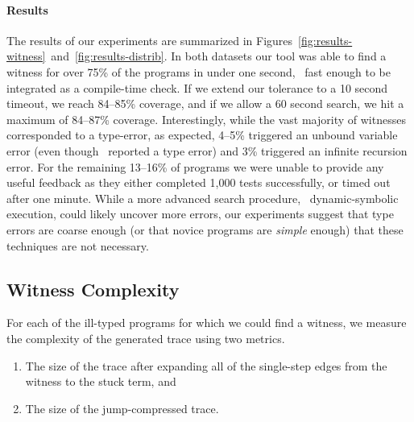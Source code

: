 \paragraph{Results}
\label{sec:nanomaly:results-witness}
The results of our experiments are summarized in
Figures~\ref{fig:results-witness}~and~\ref{fig:results-distrib}.
%
In both datasets our tool was able to find a witness for over 75\% of the
programs in under one second, \ie\ fast enough to be integrated as a
compile-time check. If we extend our tolerance to a 10 second timeout,
we reach 84--85\% coverage, and if we allow a 60 second search,
we hit a maximum of 84--87\% coverage.
%
Interestingly, while the vast majority of witnesses corresponded to a
type-error, as expected, 4--5\% triggered an unbound variable error (even
though \ocaml\ reported a type error) and 3\% triggered an infinite
recursion error.
%
For the remaining 13--16\% of programs we were unable to provide any useful
feedback as they either completed 1,000 tests successfully, or timed out
after one minute.
%
%
While a more advanced search procedure, \eg\ dynamic-symbolic execution,
could likely uncover more errors, our experiments suggest that
type errors are coarse enough (or that novice programs are \emph{simple}
enough) that these techniques are not necessary.




\subsection{Witness Complexity}
\label{sec:nanomaly:trace-complexity}

For each of the ill-typed programs for which we could
find a witness, we measure the complexity of the generated
trace using two metrics.

%
\begin{enumerate}
\item {} The size of the trace after expanding
  all of the single-step edges from the witness to the stuck term, and
\item {} The size of the jump-compressed trace.
\end{enumerate}


